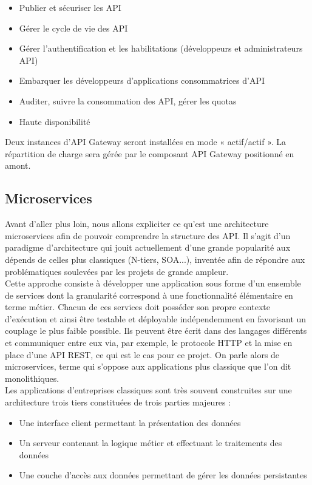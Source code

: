 	\begin{itemize}
		\item Publier et sécuriser les API
		\item Gérer le cycle de vie des API
		\item Gérer l’authentification et les habilitations (développeurs et administrateurs API)
		\item Embarquer les développeurs d’applications consommatrices d’API
		\item Auditer, suivre la consommation des API, gérer les quotas
		\item Haute disponibilité \\
	\end{itemize}

Deux instances d’API Gateway seront installées en mode « actif/actif ». La répartition de charge sera gérée par le composant API Gateway positionné en amont.
	
\subsection{Microservices}

	Avant d'aller plus loin, nous allons expliciter ce qu'est une architecture microservices \cite{bib_microservices} afin de pouvoir comprendre la structure des API. Il s'agit d'un paradigme d'architecture qui jouit actuellement d'une grande popularité aux dépends de celles plus classiques (N-tiers, SOA...), inventée afin de répondre aux problématiques soulevées par les projets de grande ampleur. \\
	
	Cette approche consiste à développer une application sous forme d'un ensemble de services dont la granularité correspond à une fonctionnalité élémentaire en terme métier. Chacun de ces services doit posséder son propre contexte d'exécution et ainsi être testable et déployable indépendemment en favorisant un couplage le plus faible possible. Ils peuvent être écrit dans des langages différents et communiquer entre eux via, par exemple, le protocole HTTP et la mise en place d'une API REST, ce qui est le cas pour ce projet. On parle alors de microservices, terme qui s'oppose aux applications plus classique que l'on dit monolithiques.\\
	
	Les applications d'entreprises classiques sont très souvent construites sur une architecture trois tiers constituées de trois parties majeures :
	\begin{itemize}
		\item Une interface client permettant la présentation des données
		\item Un serveur contenant la logique métier et effectuant le traitements des données
		\item Une couche d'accès aux données permettant de gérer les données persistantes \\
	\end{itemize}
	
